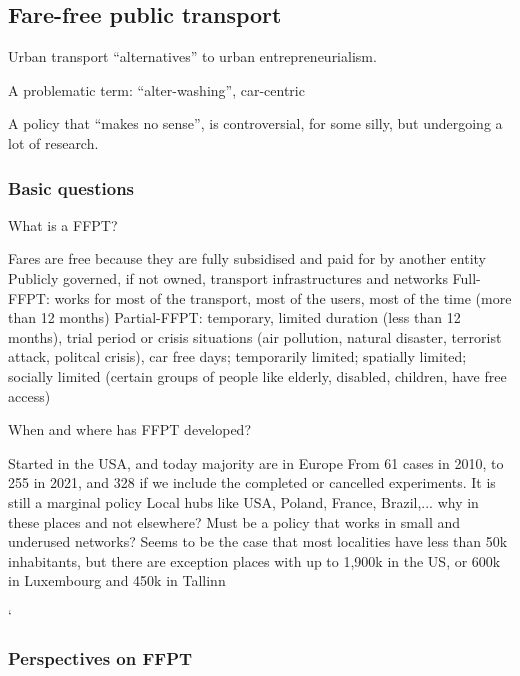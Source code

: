 \documentclass{article}
\begin{document}
\subsection{Fare-free public transport}

Urban transport ``alternatives'' to urban entrepreneurialism.

A problematic term: ``alter-washing'', car-centric 

A policy that ``makes no sense'', is controversial, for some silly, but undergoing a lot of research.

\subsubsection{Basic questions}

What is a FFPT?

\begin{outline}
	\1 Fares are free because they are fully subsidised and paid for by another entity
	\1 Publicly governed, if not owned, transport infrastructures and networks
	\1 Full-FFPT: works for most of the transport, most of the users, most of the time (more than 12 months)
	\1 Partial-FFPT: temporary, limited duration (less than 12 months), trial period or crisis situations (air pollution, natural disaster, terrorist attack, politcal crisis), car free days; temporarily limited; spatially limited; socially limited (certain groups of people like elderly, disabled, children, have free access)
\end{outline}

When and where has FFPT developed?

\begin{outline}
	\1 Started in the USA, and today majority are in Europe
	\1 From 61 cases in 2010, to 255 in 2021, and 328 if we include the completed or cancelled experiments. It is still a marginal policy
	\1 Local hubs like USA, Poland, France, Brazil,... why in these places and not elsewhere?
	\1 Must be a policy that works in small and underused networks? Seems to be the case that most localities have less than 50k inhabitants, but there are exception places with up to 1,900k in the US, or 600k in Luxembourg and 450k in Tallinn
\end{outline}`

\subsubsection{Perspectives on FFPT}
\end{document}
